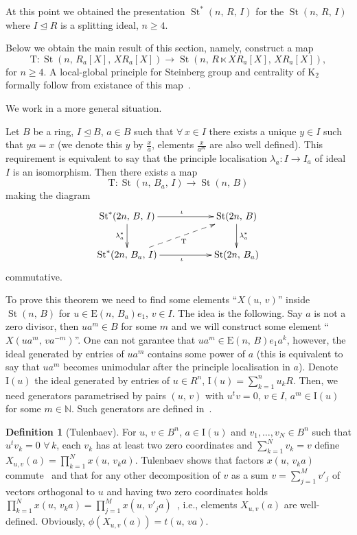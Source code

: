 \documentclass[11pt]{amsart}
\theoremstyle{plain} \declaretheorem[name=Theorem, Refname={Theorem,Theorems}]{tm} \Crefname{tm}{Theorem}{Theorems}
\numberwithin{equation}{section}
\theoremstyle{definition} \newtheorem{df}[lm]{Definition} \Crefname{df}{Definition}{Definitions}
\theoremstyle{remark} \newtheorem{rk}[lm]{Remark} \Crefname{rk}{Remark}{Remarks}
\newcommand{\E}{{\mathrm{E}}}
\newcommand{\St}{\mathop{\mathrm{St}}\nolimits}
\begin{document}
At this point we obtained the presentation $\St^*(n,\,R,\,I)$ for the $\St(n,\,R,\,I)$ where $I\trianglelefteq R$ is a splitting ideal, $n\geq4$.

Below we obtain the main result of this section, namely, construct a map 
$$
\mathrm T\colon\St(n,\,R_a[X],\,XR_a[X])\rightarrow\St(n,\,R\ltimes XR_a[X],\,XR_a[X]),
$$
for $n\geq4$. A local-global principle for Steinberg group and centrality of $\mathrm K_2$ formally follow from existance of this map~\cite[Lem.~15, Lem.~16, proof of Th.~2]{SCh}.

We work in a more general situation.

\begin{tm}
\label{a3map}
Let $B$ be a ring, $I\trianglelefteq B$, $a\in B$ such that $\forall\,x\in I$ there exists a unique $y\in I$ such that $ya=x$ {\rm(}we denote this $y$ by $\frac xa$, elements $\frac x{a^m}$ are also well defined{\rm)}. This requirement is equivalent to say that the principle localisation $\lambda_a\colon I\rightarrow I_a$ of ideal $I$ is an isomorphism. Then there exists a map
$$
\mathrm T\colon\St(n,\,B_a,\,I)\rightarrow\St(n,\,B)
$$
making the diagram
$$
\xymatrix{
\St^*(2n,\,B,\,I)\ar@<-0.0ex>[rr]^{\iota}\ar@<-0.0ex>[d]_{\lambda_{a}^*}&&\St(2n,\,B)\ar@<-0.0ex>[d]^{\lambda_{a}^*}\\
\St^*(2n,\,B_a,\,I)\ar@<-0.0ex>[rr]_{\iota}\ar@{-->}[rru]_{\mathrm T}&&\St(2n,\,B_a)
}
$$
commutative.
\end{tm}

To prove this theorem we need to find some elements ``$X(u,\,v)$'' inside $\St(n,\,B)$ for $u\in\E(n,\,B_a)e_1$, $v\in I$. The idea is the following. Say $a$ is not a zero divisor, then $ua^m\in B$ for some $m$ and we will construct some element ``$X(ua^m,\,va^{-m})$''. One can not garantee that $ua^m\in\E(n,\,B)e_1a^k$, however, the ideal generated by entries of $ua^m$ contains some power of $a$ (this is equivalent to say that $ua^m$ becomes unimodular after the principle localisation in $a$). Denote $\mathrm I(u)$ the ideal generated by entries of $u\in R^n$, $\mathrm I(u)=\sum\limits_{k=1}^nu_kR$. Then, we need generators parametrised by pairs $(u,\,v)$ with $u^tv=0$, $v\in I$, $a^m\in\mathrm I(u)$ for some $m\in\mathbb N$. Such generators are defined in~\cite{Tul}.

\begin{df}[Tulenbaev]
For $u$, $v\in B^n$, $a\in\mathrm I(u)$ and $v_1,\ldots,v_N\in B^n$ such that $u^tv_k=0$ $\forall\,k$,  each $v_k$ has at least two zero coordinates and $\sum_{k=1}^Nv_k=v$ define $X_{u,v}(a)=\prod\limits_{k=1}^Nx(u,\,v_ka)$. Tulenbaev shows that factors $x(u,\,v_ka)$ commute~\cite[Lem.~1.1\,e)]{Tul} and that for any other decomposition of $v$ as a sum $v=\sum_{j=1}^Mv'_j$ of vectors orthogonal to $u$ and having two zero coordinates holds $\prod_{k=1}^Nx(u,\,v_ka)=\prod_{j=1}^Mx(u,\,v'_ja)$~\cite[p.~3]{Tul}, i.e., elements $X_{u,v}(a)$ are well-defined. Obviously, $\phi(X_{u,v}(a))=t(u,\,va)$.
\end{df}
\end{document}
